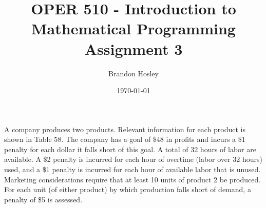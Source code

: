 \documentclass[answers]{exam}
\title{OPER 510 - Introduction to Mathematical Programming%
	\\ Assignment 3}
\author{Brandon Hosley}
\date{\today}
\begin{document}
\maketitle
\unframedsolutions

\begin{questions}
\question
A company produces two products. Relevant information for each product is shown in Table 58. The company has a goal of \$48 in profits and incurs a \$1 penalty for each dollar it falls short of this goal. A total of 32 hours of labor are available. A \$2 penalty is incurred for each hour of overtime (labor over 32 hours) used, and a \$1 penalty is incurred for each hour of available labor that is unused. Marketing considerations require that at least 10 units of product 2 be produced. For each unit (of either product) by which production falls short of demand, a penalty of \$5 is assessed.



\end{questions}
\end{document}
